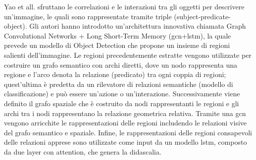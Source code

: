 Yao et all. \cite{yao2018exploring} sfruttano le correlazioni e le interazioni tra gli oggetti per descrivere un'immagine, le quali sono rappresentate tramite triple (subject-predicate-object). %
Gli autori hanno introdotto un'architettura innovativa chiamata Graph Convolutional Networks + Long Short-Term Memory (\acrshort{gcn}+\acrshort{lstm}), la quale prevede un modello di Object Detection che propone un insieme di regioni salienti dell'immagine.
Le regioni precedentemente estratte vengono utilizzate per costruire un grafo semantico con archi diretti, dove un nodo rappresenta una regione e l'arco denota la relazione (predicato) tra ogni coppia di regioni; quest'ultima è predetta da un rilevatore di relazioni semantiche (modello di classificazione) e può essere un'azione o un'interazione. Successivamente viene definito il grafo spaziale che è costruito da nodi rappresentanti le regioni e gli archi tra i nodi rappresentano la relazione geometrica relativa. 
Tramite una \acrfull{gcn} vengono arricchite le rappresentazioni delle regioni includendo le relazioni visive del grafo semantico e spaziale. Infine, le rappresentazioni delle regioni consapevoli delle relazioni apprese sono utilizzate come input da un modello \acrshort{lstm}, composto da due layer con attention, che genera la didascalia. 



